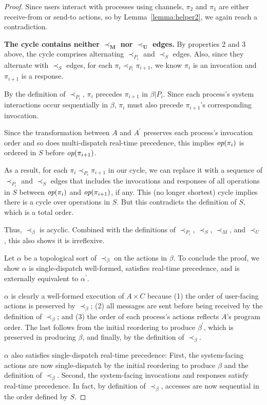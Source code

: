 \begin{proof}
  Since users interact with processes using channels, $\pi_2$ and $\pi_1$ are either receive-from or send-to actions, so by Lemma~\ref{lemma:helper2}, we again reach a contradiction.

  \noindent \textbf{The cycle contains neither $\mathbf{\prec_M}$ nor $\mathbf{\prec_U}$ edges.}
  By properties 2 and 3 above, the cycle comprises alternating $\prec_{P_i}$ and $\prec_S$ edges. Also, since they alternate with $\prec_S$ edges, for each $\pi_i \prec_{P_i} \pi_{i+1}$, we know $\pi_i$ is an invocation and $\pi_{i+1}$ is a response.

  By the definition of $\prec_{P_i}$, $\pi_i$ precedes $\pi_{i+1}$ in $\beta | P_i$. Since each process’s system interactions occur sequentially in $\beta$, $\pi_i$ must also precede $\pi_{i+1}$'s corresponding invocation.

  Since the transformation between $A$ and $A^\prime$ preserves each process’s invocation order and so does multi-dispatch real-time precedence, this implies $\operatorname*{\textit{op}}(\pi_i)$ is ordered in $S$ before $\operatorname*{\textit{op}}(\pi_{i+1})$.

  As a result, for each $\pi_i \prec_{P_i} \pi_{i+1}$ in our cycle, we can replace it with a sequence of $\prec_{P_i}$ and $\prec_S$ edges that includes the invocations and responses of all operations in $S$ between $\operatorname*{\textit{op}}(\pi_i)$ and $\operatorname*{\textit{op}}(\pi_{i+1})$, if any. This (no longer shortest) cycle implies there is a cycle over operations in $S$. But this contradicts the definition of $S$, which is a total order.

  Thus, $\prec_\beta$ is acyclic. Combined with the definitions of $\prec_{P_i}$, $\prec_S$, $\prec_M$, and $\prec_U$, this also shows it is irreflexive.

  Let $\alpha$ be a topological sort of $\prec_\beta$ on the actions in $\beta$. To conclude the proof, we show $\alpha$ is single-dispatch well-formed, satisfies real-time precedence, and is externally equivalent to $\alpha^\prime$.

  $\alpha$ is clearly a well-formed execution of $A \times C$ because
  (1) the order of user-facing actions is preserved by $\prec_\beta$;
  (2) all messages are sent before being received by the definition of $\prec_\beta$; and
  (3) the order of each process’s actions reflects $A$’s program order.
  The last follows from the initial reordering to produce $\beta^\prime$, which is preserved in producing $\beta$, and finally, by the definition of $\prec_\beta$.

  $\alpha$ also satisfies single-dispatch real-time precedence:
  First, the system-facing actions are now single-dispatch by the initial reordering to produce $\beta$ and the definition of $\prec_\beta$.
  Second, the system-facing invocations and responses satisfy real-time precedence. In fact, by definition of $\prec_\beta$, accesses are now sequential in the order defined by $S$.


\end{proof}
